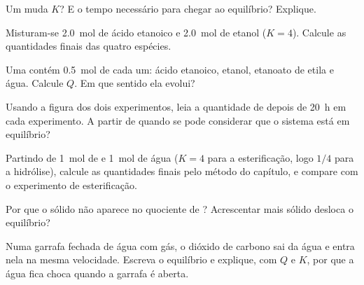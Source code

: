 \begin{exercise}[$\star$]\label{exo:g12:equilibrium:5}
Um  muda $K$? E o tempo necessário para chegar ao equilíbrio?
Explique.
\end{exercise}

\begin{exercise}[$\star\star$]\label{exo:g12:equilibrium:6}
Misturam-se \qty{2.0}{mol} de ácido etanoico e \qty{2.0}{mol} de etanol
($K = 4$). Calcule as quantidades finais das quatro espécies.
\end{exercise}

\begin{exercise}[$\star\star$]\label{exo:g12:equilibrium:7}
Uma  contém \qty{0.5}{mol} de cada um: ácido etanoico, etanol,
etanoato de etila e água. Calcule $Q$. Em que sentido ela evolui?
\end{exercise}

\begin{exercise}[$\star\star$]\label{exo:g12:equilibrium:8}
Usando a figura dos dois experimentos, leia a quantidade de  depois
de \qty{20}{h} em cada experimento. A partir de quando se pode
considerar que o sistema está em equilíbrio?
\end{exercise}

\begin{exercise}[$\star\star$]\label{exo:g12:equilibrium:9}
Partindo de \qty{1}{mol} de  e \qty{1}{mol} de água ($K = 4$ para
a esterificação, logo $1/4$ para a hidrólise), calcule as quantidades
finais pelo método do capítulo, e compare com o experimento de
esterificação.
\end{exercise}

\begin{exercise}[$\star\star$]\label{exo:g12:equilibrium:10}
Por que o sólido não aparece no quociente de
? Acrescentar mais sólido desloca o
equilíbrio?
\end{exercise}

\begin{exercise}[$\star\star$]\label{exo:g12:equilibrium:11}
Numa garrafa fechada de água com gás, o dióxido de carbono sai da água e
entra nela na mesma velocidade. Escreva o equilíbrio
 e explique, com $Q$ e $K$, por que a água fica
choca quando a garrafa é aberta.
\end{exercise}

